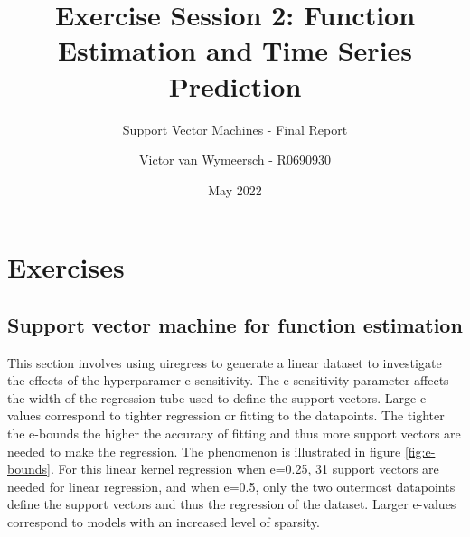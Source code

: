 \documentclass{article}
\title{Exercise Session 2: Function Estimation and Time Series Prediction}
\subtitle{Support Vector Machines - Final Report}
\author{Victor van Wymeersch - R0690930}
\date{May 2022}
\begin{document}
\maketitle
    
\section{Exercises} 
    \subsection{Support vector machine for function estimation} 
        This section involves using uiregress to generate a linear dataset to investigate the effects of the hyperparamer e-sensitivity. The e-sensitivity parameter affects the width of the regression tube used to define the support vectors. Large e values correspond to tighter regression or fitting to the datapoints. The tighter the e-bounds the higher the accuracy of fitting and thus more support vectors are needed to make the regression. The phenomenon is illustrated in figure \ref{fig:e-bounds}. For this linear kernel regression when e=0.25, 31 support vectors are needed for linear regression, and when e=0.5, only the two outermost datapoints define the support vectors and thus the regression of the dataset. Larger e-values correspond to models with an increased level of sparsity. 
\end{document}
